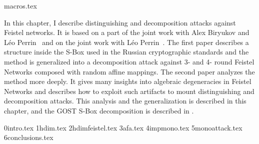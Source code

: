 \myminitoc

{macros.tex}

In this chapter, I describe distinguishing and decomposition attacks against Feistel networks. It is based on a part of the joint work with Alex Biryukov and Léo Perrin~\cite{OurKuz1} and on the joint work with Léo Perrin~\cite{OurFeistel}. The first paper describes a structure inside the S-Box used in the Russian cryptographic standards and the method is generalized into a decomposition attack against 3- and 4- round Feistel Networks composed with random affine mappings. The second paper analyzes the method more deeply. It gives many insights into algebraic degeneracies in Feistel Networks and describes how to exploit such artifacts to mount distinguishing and decomposition attacks. This analysis and the generalization is described in this chapter, and the GOST S-Box decomposition is described in .

{0intro.tex}
{1hdim.tex}
{2hdimfeistel.tex}
{3afa.tex}
{4impmono.tex}
{5monoattack.tex}
{6conclusions.tex}